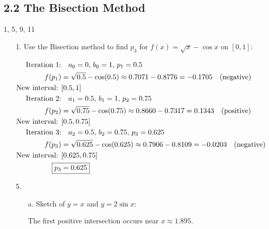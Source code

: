   \subsection*{2.2 The Bisection Method}
  1, 5, 9, 11

  \begin{enumerate}
    \item[1.] Use the Bisection method to find \( p_3 \) for \( f(x)
      = \sqrt{x} - \cos x \) on \([0,1]\):

      \[
        \begin{aligned}
          \text{Iteration 1:} & \quad a_0 = 0, \, b_0 = 1, \, p_1 = 0.5 \\
          f(p_1) &= \sqrt{0.5} - \cos(0.5) \approx 0.7071 - 0.8776 =
          -0.1705 \quad (\text{negative}) \\
          \text{New interval: } & [0.5, 1] \\
          \text{Iteration 2:} & \quad a_1 = 0.5, \, b_1 = 1, \, p_2 = 0.75 \\
          f(p_2) &= \sqrt{0.75} - \cos(0.75) \approx 0.8660 - 0.7317
          = 0.1343 \quad (\text{positive}) \\
          \text{New interval: } & [0.5, 0.75] \\
          \text{Iteration 3:} & \quad a_2 = 0.5, \, b_2 = 0.75, \,
          p_3 = 0.625 \\
          f(p_3) &= \sqrt{0.625} - \cos(0.625) \approx 0.7906 -
          0.8109 = -0.0203 \quad (\text{negative}) \\
          \text{New interval: } & [0.625, 0.75] \\
          \Aboxed{p_3 &= 0.625}
        \end{aligned}
      \]

      \bigbreak

    \item[5.]
      \begin{itemize}
        \item[a.] Sketch of \( y = x \) and \( y = 2\sin x \):
          \begin{center}
          \end{center}
          The first positive intersection occurs near \( x \approx 1.895 \).


\end{itemize}
\end{enumerate}
